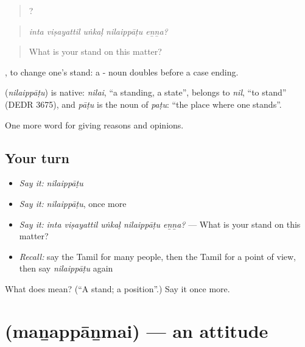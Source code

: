 \begin{quote}
    ?
\end{quote}

\begin{quote}
\emph{inta viṣayattil uṅkaḷ nilaippāṭu eṉṉa?}
\end{quote}

\begin{quote}
What is your stand on this matter?
\end{quote}

 , to change one's stand: a - noun doubles before a case ending.

\begin{cousinweb}
\textbf{} (\emph{nilaippāṭu}) is native: \emph{nilai}, \textquotedblleft{}a standing, a state\textquotedblright{}, belongs to \emph{nil}, \textquotedblleft{}to stand\textquotedblright{} (DEDR 3675), and \emph{pāṭu} is the noun of \emph{paṭu}: \textquotedblleft{}the place where one stands\textquotedblright{}.
\end{cousinweb}

\begin{grammarlens}[title={What you've built}]
One more word for giving reasons and opinions.
\end{grammarlens}

\subsection*{Your turn}
\begin{itemize}
\raggedright
  \item \emph{Say it:} \emph{nilaippāṭu}
  \item \emph{Say it:} \emph{nilaippāṭu}, once more
  \item \emph{Say it:} \emph{inta viṣayattil uṅkaḷ nilaippāṭu eṉṉa?} — What is your stand on this matter?
  \item \emph{Recall:} say the Tamil for many people, then the Tamil for a point of view, then say \emph{nilaippāṭu} again
\end{itemize}

\begin{tcolorbox}[breakable,colback=teal!4,colframe=teal!35!black,title={Before you move on}]
What does  mean? (\textquotedblleft{}A stand; a position\textquotedblright{}.) Say it once more.
\end{tcolorbox}
\section[\texorpdfstring{\ta{மனப்பான்மை} (maṉappāṉmai)}{மனப்பான்மை (maṉappāṉmai)}]{ (maṉappāṉmai) — an attitude}

